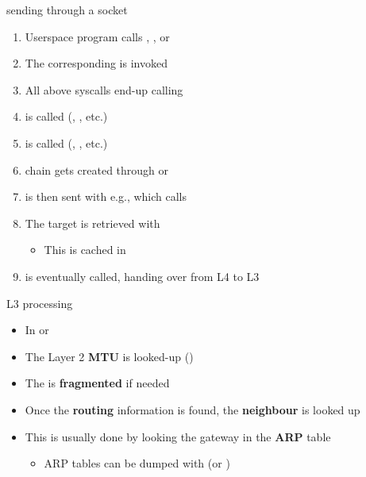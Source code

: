 \begin{frame}{sending through a socket}
	\begin{enumerate}
		\item Userspace program calls , ,  or  
		\item The corresponding  is invoked
		\item All above syscalls end-up calling 
		\item {} is called (, , etc.)
		\item {} is called (, , etc.)
		\item {} chain gets created through  or 
		\item {} is then sent with e.g., which calls 
		\item The target  is retrieved with 
			\begin{itemize}
				\item This is cached in 
			\end{itemize}
		\item {} is eventually called, handing over from L4 to L3
	\end{enumerate}
\end{frame}

\begin{frame}{L3 processing}
	\begin{itemize}
		\item In  or 
		\item The Layer 2 \textbf{MTU} is looked-up ()
		\item The  is \textbf{fragmented} if needed
		\item Once the \textbf{routing} information is found, the \textbf{neighbour} is looked up
		\item This is usually done by looking the gateway in the \textbf{ARP} table
			\begin{itemize}
				\item ARP tables can be dumped with  (or )
			\end{itemize}
	\end{itemize}
\end{frame}



